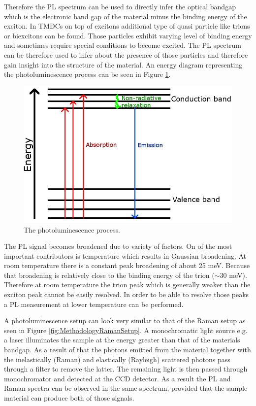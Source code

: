 Therefore the PL spectrum can be used to directly infer the optical bandgap which is the electronic band gap of the material minus the binding energy of the exciton. In TMDCs on top of excitons additional type of quasi particle like trions or biexcitons can be found. Those particles exhibit varying level of binding energy and sometimes require special conditions to become excited. The PL spectrum can be therefore used to infer about the presence of those particles and therefore gain insight into the structure of the material. An energy diagram representing the photoluminescence process can be seen in Figure \ref{fig:MethodologyPLDiagram}.

\begin{figure}[!ht]
	\begin{center}
		\includegraphics[scale=0.7]{Methodology/PLDiagram.png}
		\caption{The photoluminescence process.}
		\label{fig:MethodologyPLDiagram}
	\end{center}
\end{figure}

The PL signal becomes broadened due to variety of factors. On of the most important contributors is temperature which results in Gaussian broadening. At room temperature there is a constant peak broadening of about 25 meV. Because that broadening is relatively close to the binding energy of the trion ($\sim$30 meV). Therefore at room temperature the trion peak which is generally weaker than the exciton peak cannot be easily resolved. In order to be able to resolve those peaks a PL measurement at lower temperature can be performed.

A photoluminescence setup can look very similar to that of the Raman setup as seen in Figure \ref{fig:MethodologyRamanSetup}. A monochromatic light source e.g. a laser illuminates the sample at the energy greater than that of the materials bandgap. As a result of that the photons emitted from the material together with the inelastically (Raman) and elastically (Rayleigh) scattered photons pass through a filter to remove the latter. The remaining light is then passed through monochromator and detected at the CCD detector. As a result the PL and Raman spectra can be observed in the same spectrum, provided that the sample material can produce both of those signals. 

